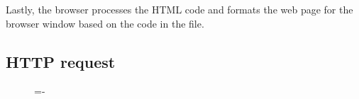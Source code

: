 \documentclass[a4paper]{systems-software}
\begin{document}
Lastly, the browser processes the HTML code and formats the web page for the browser window based on the code in the file.


\newpage

\subsection*{HTTP request}

\begin{figure}[H]
	\lineskip=-\fboxrule
\end{figure}
\end{document}
